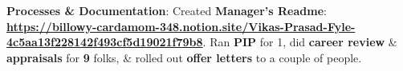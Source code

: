 \documentclass[letterpaper,11pt]{article}
\newcommand{\resumeItem}[2]{
  \item\small{
    \textbf{#1}{: #2 \vspace{-2pt}}
  }
}
\begin{document}
          \resumeItem{Processes \& Documentation}
            {Created \textbf{Manager’s Readme}: \href{https://billowy-cardamom-348.notion.site/Vikas-Prasad-Fyle-4c5aa13f228142f493cf5d19021f79b8}{\textbf{https://billowy-cardamom-348.notion.site/Vikas-Prasad-Fyle-4c5aa13f228142f493cf5d19021f79b8}}. Ran \textbf{PIP} for 1, did \textbf{career review} \& \textbf{appraisals} for \textbf{9} folks, \& rolled out \textbf{offer letters} to a couple of people.}
\end{document}
